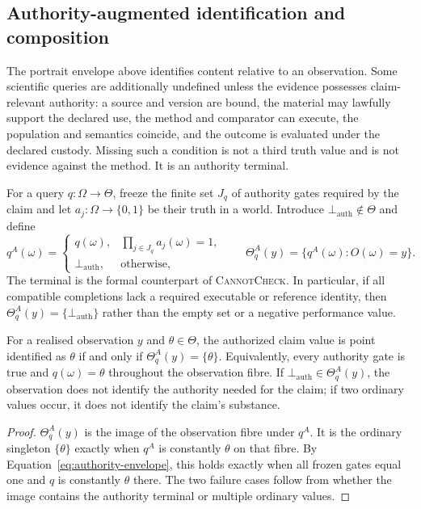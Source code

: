 \subsection{Authority-augmented identification and composition}
\label{sec:authority-augmented}

The portrait envelope above identifies content relative to an observation.
Some scientific queries are additionally undefined unless the evidence
possesses claim-relevant authority: a source and version are bound, the
material may lawfully support the declared use, the method and comparator can
execute, the population and semantics coincide, and the outcome is evaluated
under the declared custody. Missing such a condition is not a third truth
value and is not evidence against the method. It is an authority terminal.

For a query $q:\Omega\to\Theta$, freeze the finite set $J_q$ of authority
gates required by the claim and let $a_j:\Omega\to\{0,1\}$ be their truth in a
world. Introduce $\bot_{\mathrm{auth}}\notin\Theta$ and define
\begin{equation}
 q^A(\omega)=
 \begin{cases}
 q(\omega),&\prod_{j\in J_q}a_j(\omega)=1,\\
 \bot_{\mathrm{auth}},&\text{otherwise},
 \end{cases}
 \qquad
 \Theta^A_q(y)=\{q^A(\omega):O(\omega)=y\}.
 \label{eq:authority-envelope}
\end{equation}
The terminal is the formal counterpart of \textsc{CannotCheck}. In
particular, if all compatible completions lack a required executable or
reference identity, then $\Theta^A_q(y)=\{\bot_{\mathrm{auth}}\}$ rather than
the empty set or a negative performance value.

\begin{theorem}
\label{thm:authority-fibre}
For a realised observation $y$ and $\theta\in\Theta$, the authorized claim
value is point identified as $\theta$ if and only if
$\Theta^A_q(y)=\{\theta\}$. Equivalently, every authority gate is true and
$q(\omega)=\theta$ throughout the observation fibre. If
$\bot_{\mathrm{auth}}\in\Theta^A_q(y)$, the observation does not identify the
authority needed for the claim; if two ordinary values occur, it does not
identify the claim's substance.
\end{theorem}

\begin{proof}
$\Theta^A_q(y)$ is the image of the observation fibre under $q^A$. It is the
ordinary singleton $\{\theta\}$ exactly when $q^A$ is constantly $\theta$ on
that fibre. By Equation~\eqref{eq:authority-envelope}, this holds exactly when
all frozen gates equal one and $q$ is constantly $\theta$ there. The two
failure cases follow from whether the image contains the authority terminal or
multiple ordinary values.
\end{proof}

